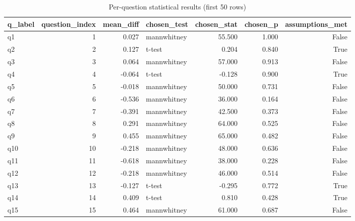 \begin{table}[ht]
\centering
\begin{tabular}{lrrlrrr}
\toprule
q_label & question_index & mean_diff & chosen_test & chosen_stat & chosen_p & assumptions_met \\
\midrule
q1 & 1 & 0.027 & mannwhitney & 55.500 & 1.000 & False \\
q2 & 2 & 0.127 & t-test & 0.204 & 0.840 & True \\
q3 & 3 & 0.064 & mannwhitney & 57.000 & 0.913 & False \\
q4 & 4 & -0.064 & t-test & -0.128 & 0.900 & True \\
q5 & 5 & -0.018 & mannwhitney & 50.000 & 0.731 & False \\
q6 & 6 & -0.536 & mannwhitney & 36.000 & 0.164 & False \\
q7 & 7 & -0.391 & mannwhitney & 42.500 & 0.373 & False \\
q8 & 8 & 0.291 & mannwhitney & 64.000 & 0.525 & False \\
q9 & 9 & 0.455 & mannwhitney & 65.000 & 0.482 & False \\
q10 & 10 & -0.218 & mannwhitney & 48.000 & 0.636 & False \\
q11 & 11 & -0.618 & mannwhitney & 38.000 & 0.228 & False \\
q12 & 12 & -0.218 & mannwhitney & 46.000 & 0.514 & False \\
q13 & 13 & -0.127 & t-test & -0.295 & 0.772 & True \\
q14 & 14 & 0.409 & t-test & 0.810 & 0.428 & True \\
q15 & 15 & 0.464 & mannwhitney & 61.000 & 0.687 & False \\
\bottomrule
\end{tabular}
\caption{Per-question statistical results (first 50 rows)}\n\label{tab:questions}\n\end{table}
